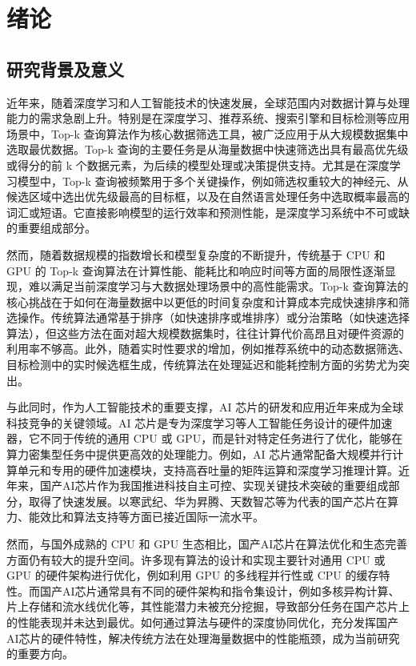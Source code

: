 \chapter{绪论}
\section{研究背景及意义}
近年来，随着深度学习和人工智能技术的快速发展，全球范围内对数据计算与处理能力的需求急剧上升。特别是在深度学习、推荐系统、搜索引擎和目标检测等应用场景中，Top-k 查询算法作为核心数据筛选工具，被广泛应用于从大规模数据集中选取最优数据。Top-k 查询的主要任务是从海量数据中快速筛选出具有最高优先级或得分的前 k 个数据元素，为后续的模型处理或决策提供支持。尤其是在深度学习模型中，Top-k 查询被频繁用于多个关键操作，例如筛选权重较大的神经元、从候选区域中选出优先级最高的目标框，以及在自然语言处理任务中选取概率最高的词汇或短语。它直接影响模型的运行效率和预测性能，是深度学习系统中不可或缺的重要组成部分。

然而，随着数据规模的指数增长和模型复杂度的不断提升，传统基于 CPU 和 GPU 的 Top-k 查询算法在计算性能、能耗比和响应时间等方面的局限性逐渐显现，难以满足当前深度学习与大数据处理场景中的高性能需求。Top-k 查询算法的核心挑战在于如何在海量数据中以更低的时间复杂度和计算成本完成快速排序和筛选操作。传统算法通常基于排序（如快速排序或堆排序）或分治策略（如快速选择算法），但这些方法在面对超大规模数据集时，往往计算代价高昂且对硬件资源的利用率不够高。此外，随着实时性要求的增加，例如推荐系统中的动态数据筛选、目标检测中的实时候选框生成，传统算法在处理延迟和能耗控制方面的劣势尤为突出。

与此同时，作为人工智能技术的重要支撑，AI 芯片的研发和应用近年来成为全球科技竞争的关键领域。AI 芯片是专为深度学习等人工智能任务设计的硬件加速器，它不同于传统的通用 CPU 或 GPU，而是针对特定任务进行了优化，能够在算力密集型任务中提供更高效的处理能力。例如，AI 芯片通常配备大规模并行计算单元和专用的硬件加速模块，支持高吞吐量的矩阵运算和深度学习推理计算。近年来，国产AI芯片作为我国推进科技自主可控、实现关键技术突破的重要组成部分，取得了快速发展。以寒武纪、华为昇腾、天数智芯等为代表的国产芯片在算力、能效比和算法支持等方面已接近国际一流水平。

然而，与国外成熟的 CPU 和 GPU 生态相比，国产AI芯片在算法优化和生态完善方面仍有较大的提升空间。许多现有算法的设计和实现主要针对通用 CPU 或 GPU 的硬件架构进行优化，例如利用 GPU 的多线程并行性或 CPU 的缓存特性。而国产AI芯片通常具有不同的硬件架构和指令集设计，例如多核异构计算、片上存储和流水线优化等，其性能潜力未被充分挖掘，导致部分任务在国产芯片上的性能表现并未达到最优。如何通过算法与硬件的深度协同优化，充分发挥国产AI芯片的硬件特性，解决传统方法在处理海量数据中的性能瓶颈，成为当前研究的重要方向。

